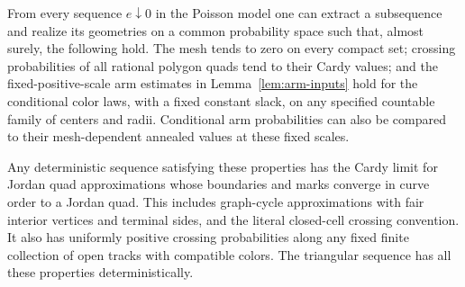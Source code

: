 \begin{lemma}\label{lem:good-sequences}
From every sequence $e\downarrow0$ in the Poisson model one can
extract a subsequence and realize its geometries on a common
probability space such that, almost surely, the following hold.
The mesh tends to zero on every compact set; crossing probabilities
of all rational polygon quads tend to their Cardy values; and the
fixed-positive-scale arm estimates in Lemma~\ref{lem:arm-inputs}
hold for the conditional color laws, with a fixed constant slack,
on any specified countable family of centers and radii.  Conditional
arm probabilities can also be compared to their mesh-dependent
annealed values at these fixed scales.

Any deterministic sequence satisfying these properties has the
Cardy limit for Jordan quad approximations whose boundaries and
marks converge in curve order to a Jordan quad.  This includes
graph-cycle approximations with fair interior vertices and terminal
sides, and the literal closed-cell crossing convention.  It also
has uniformly positive crossing probabilities along any fixed
finite collection of open tracks with compatible colors.  The
triangular sequence has all these properties deterministically.
\end{lemma}

